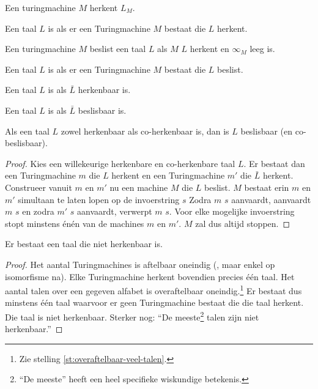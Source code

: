 \documentclass[main.tex]{subfiles}
\begin{document}
\begin{de}
  Een turingmachine $M$ herkent $L_{M}$.
\end{de}

\begin{de}
  Een taal $L$ is  als er een Turingmachine $M$ bestaat die $L$ herkent.
\end{de}

\begin{de}
  Een turingmachine $M$ beslist een taal $L$ als $M$ $L$ herkent en $\infty_{M}$ leeg is.
\end{de}

\begin{de}
  Een taal $L$ is  als er een Turingmachine $M$ bestaat die $L$ beslist.
\end{de}

\begin{de}
  Een taal $L$ is  als $\bar{L}$ herkenbaar is.
\end{de}

\begin{de}
  Een taal $L$ is  als $\bar{L}$ beslisbaar is.
\end{de}

\begin{st}
  Als een taal $L$ zowel herkenbaar als co-herkenbaar is, dan is $L$ beslisbaar (en co-beslisbaar).
  \begin{proof}
    Kies een willekeurige herkenbare en co-herkenbare taal $L$.
    Er bestaat dan een Turingmachine $m$ die $L$ herkent en een Turingmachine $m'$ die $\bar{L}$ herkent.
    Construeer vanuit $m$ en $m'$ nu een machine $M$ die $L$ beslist.
    $M$ bestaat erin $m$ en $m'$ simultaan te laten lopen op de invoerstring $s$
    Zodra $m$ $s$ aanvaardt, aanvaardt $m$ $s$ en zodra $m'$ $s$ aanvaardt, verwerpt $m$ $s$.
    Voor elke mogelijke invoerstring stopt minstens \'en\'en van de machines $m$ en $m'$.
    $M$ zal dus altijd stoppen.
  \end{proof}
\end{st}

\begin{st}
  Er bestaat een taal die niet herkenbaar is.
  \begin{proof}
    Het aantal Turingmachines is aftelbaar oneindig (, maar enkel op isomorfisme na).
    Elke Turingmachine herkent bovendien precies \'e\'en taal.
    Het aantal talen over een gegeven alfabet is overaftelbaar oneindig.\footnote{Zie stelling \ref{st:overaftelbaar-veel-talen}.}
    Er bestaat dus minstens \'e\'en taal waarvoor er geen Turingmachine bestaat die die taal herkent.
    Die taal is niet herkenbaar.
    Sterker nog: ``De meeste\footnote{``De meeste'' heeft een heel specifieke wiskundige betekenis.} talen zijn niet herkenbaar.''
  \end{proof}
\end{st}
\end{document}
